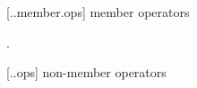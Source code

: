  [\iotwod..member.ops] {\tcode{} member operators}

\indexlibrary{\idxcode{}!\idxcode{}}
\indexlibrary{\idxcode{}!\idxcode{}}
\begin{itemdecl}
\end{itemdecl}
\begin{itemdescr}
	\pnum
	\effects
	
	\pnum
	\returns
	.
\end{itemdescr}

 [\iotwod..ops] {\tcode{} non-member operators}

\indexlibrary{\idxcode{}!\idxcode{}}
\indexlibrary{\idxcode{}!\idxcode{}}
\begin{itemdecl}
\end{itemdecl}
\begin{itemdescr}
	\pnum
	\returns
\end{itemdescr}
